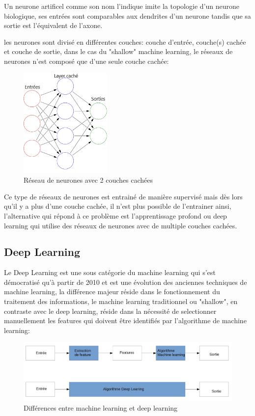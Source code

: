 Un neurone artificel comme son nom l'indique imite la topologie d'un neurone biologique,
ses entrées sont comparables aux dendrites d'un neurone tandis que sa 
sortie est l'équivalent de l'axone. \newline

les neurones sont divisé en différentes couches: couche d'entrée, couche(s) cachée
et couche de sortie, dans le cas du "shallow" machine learning, le réseaux de neurones 
n'est composé que d'une seule couche cachée: 

\begin{figure}[!h]
    \centering
    \includegraphics[width=0.4\textwidth]{Images/shallownnoverview}
    \caption{Réseau de neurones avec 2 couches cachées}
	\label{fig:NN2Layers}
\end{figure}

Ce type de réseaux de neurones est entrainé de manière supervisé mais dès lors qu'il 
y a plus d'une couche cachée, il n'est plus possible de l'entrainer ainsi,
l'alternative qui répond à ce problème est l'apprentissage profond ou 
deep learning qui utilise des réseaux de neurones avec de multiple couches 
cachées.  


\subsection{Deep Learning}
Le Deep Learning est une sous catégorie du machine learning qui s'est démocratisé
qu'à partir de 2010 et est une évolution des anciennes techniques de machine learning, 
la différence majeur réside dans le fonctionnement du traitement des 
informations, le machine learning traditionnel ou "shallow", en contraste avec le deep 
learning, réside dans la nécessité de selectionner manuellement les features 
qui doivent être identifiés par l'algorithme de machine learning:

\begin{figure}[!h]
    \centering
    \includegraphics[width=1\textwidth]{Images/MLvsDL}
    \caption{Différences entre machine learning et deep learning}
	\label{fig:DiffMLDL}
\end{figure}

